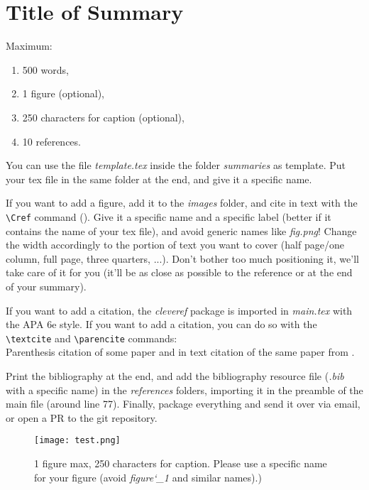 \documentclass[../main.tex]{subfiles}
\begin{document}
\section{Title of Summary}



Maximum:
\begin{enumerate}
	\item 500 words,
	\item 1 figure (optional),
	\item 250 characters for caption (optional),
	\item 10 references.
\end{enumerate}

You can use the file \emph{template.tex} inside the folder \emph{summaries} as template. Put your tex file in the same folder at the end, and give it a specific name.

If you want to add a figure, add it to the \emph{images} folder, and cite in text with the \verb|\Cref| command (). Give it a specific name and a specific label (better if it contains the name of your tex file), and avoid generic names like \emph{fig.png}! Change the width accordingly to the portion of text you want to cover (half page/one column, full page, three quarters, ...). Don't bother too much positioning it, we'll take care of it for you (it'll be as close as possible to the reference or at the end of your summary).

If you want to add a citation, the \emph{cleveref} package is imported in \emph{main.tex} with the APA 6e style. If you want to add a citation, you can do so with the \verb|\textcite| and \verb|\parencite| commands: \\
Parenthesis citation of some paper \parencite{Gau2021} and in text citation of the same paper from \textcite{Gau2021}.

Print the bibliography at the end, and add the bibliography resource file (\emph{.bib} with a specific name) in the \emph{references} folders, importing it in the preamble of the main file (around line 77).
Finally, package everything and send it over via email, or open a PR to the git repository.

\begin{figure}
	\centering
	\texttt{[image: test.png]}
	\caption{1 figure max, 250 characters for caption. Please use a specific name for your figure (avoid \emph{figure\char`_1} and similar names).)}
	\label{fig:test}
\end{figure}
\end{document}
